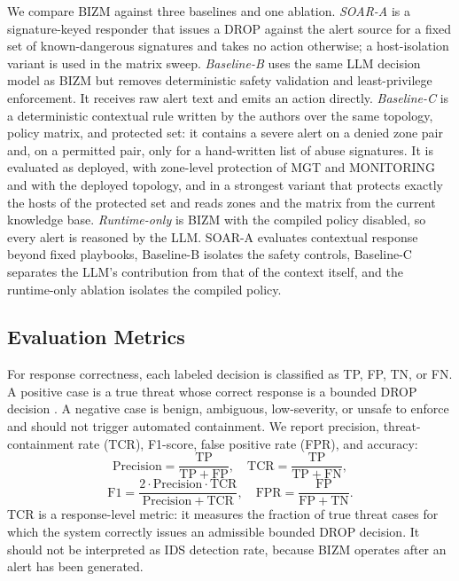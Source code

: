 \documentclass[final,5p]{elsarticle}
\begin{document}
We compare BIZM against three baselines and one ablation. \emph{SOAR-A} is a signature-keyed responder that issues a DROP against the alert source for a fixed set of known-dangerous signatures and takes no action otherwise; a host-isolation variant is used in the matrix sweep. \emph{Baseline-B} uses the same LLM decision model as BIZM but removes deterministic safety validation and least-privilege enforcement. It receives raw alert text and emits an action directly. \emph{Baseline-C} is a deterministic contextual rule written by the authors over the same topology, policy matrix, and protected set: it contains a severe alert on a denied zone pair and, on a permitted pair, only for a hand-written list of abuse signatures. It is evaluated as deployed, with zone-level protection of MGT and MONITORING and with the deployed topology, and in a strongest variant that protects exactly the hosts of the protected set and reads zones and the matrix from the current knowledge base. \emph{Runtime-only} is BIZM with the compiled policy disabled, so every alert is reasoned by the LLM. SOAR-A evaluates contextual response beyond fixed playbooks, Baseline-B isolates the safety controls, Baseline-C separates the LLM's contribution from that of the context itself, and the runtime-only ablation isolates the compiled policy.

\subsection{Evaluation Metrics}
\label{sec:evaluation_metrics}

For response correctness, each labeled decision is classified as TP, FP, TN, or FN. A positive case is a true threat whose correct response is a bounded DROP decision \cite{jSAID23}. A negative case is benign, ambiguous, low-severity, or unsafe to enforce and should not trigger automated containment. We report precision, threat-containment rate (TCR), F1-score, false positive rate (FPR), and accuracy:
\[
\mathrm{Precision}=\frac{\mathrm{TP}}{\mathrm{TP}+\mathrm{FP}},
\quad
\mathrm{TCR}=\frac{\mathrm{TP}}{\mathrm{TP}+\mathrm{FN}},
\]
\[
\mathrm{F1}=\frac{2\cdot \mathrm{Precision}\cdot \mathrm{TCR}}
{\mathrm{Precision}+\mathrm{TCR}},
\quad
\mathrm{FPR}=\frac{\mathrm{FP}}{\mathrm{FP}+\mathrm{TN}}.
\]
TCR is a response-level metric: it measures the fraction of true threat cases for which the system correctly issues an admissible bounded DROP decision. It should not be interpreted as IDS detection rate, because BIZM operates after an alert has been generated.
\end{document}
